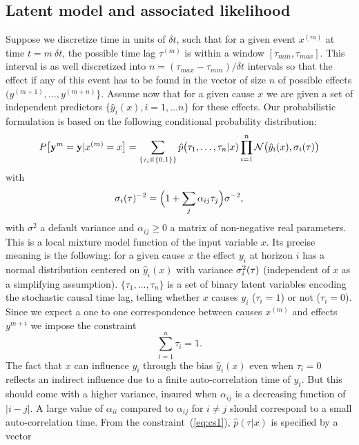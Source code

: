 \documentclass[envcountsect,runningheads]{llncs}
\theoremstyle{etoile}
\begin{document}
\subsection{Latent model and associated likelihood}\label{sec:latent}

Suppose we discretize time in units of $\delta t$, such that for a given event $x^{(m)}$ at time  
$t = m\ \delta t$, the possible time lag $\tau^{(m)}$ is within a window $[\tau_{min},\tau_{max}]$. 
This interval is as well discretized into $n = (\tau_{max}-\tau_{min})/\delta t $ intervals so that 
the effect if any of this event has to be found in the vector of size $n$ of possible effects $(y^{(m+1)},\ldots,y^{(m+n)}\}$.
Assume now that for a given cause $x$ we are given a set of independent predictors $\{\hat y_i(x),i=1,\ldots n\}$ for these effects.
Our probabilistic formulation is based on the following conditional probability distribution:
\begin{equation}\label{eq:py}
  P\bigl[{\bf y}^{m} = {\bf y}\vert x^{(m)}=x\bigr] = \sum_{\{\tau_i\in\{0,1\}\}}  \hat p\bigl(\tau_1,\ldots,\tau_n\vert x)
\prod_{i=1}^n {\cal N}\bigl(\hat y_i(x),\sigma_i(\tau)\bigr)
\end{equation}
with 
\[
\sigma_i({\bf \tau})^{-2} = \Bigl(1+\sum_j\alpha_{ij} \tau_j\Bigr)\sigma^{-2},
\]
with $\sigma^2$ a default variance and $\alpha_{ij}\ge 0$ a matrix of non-negative real parameters. 
This is a local mixture model function of the input variable $x$. Its precise meaning is the following: for a given cause $x$ the effect
$y_i$ at horizon $i$ has a normal distribution centered on $\hat y_i(x)$ with  variance $\sigma_i^2({\bf \tau})$ (independent of $x$ as a simplifying assumption). $\{\tau_1,\ldots,\tau_n\}$ is a set of binary
latent variables encoding the stochastic causal time lag, telling whether $x$ causes $y_i$ ($\tau_i=1$) or not ($\tau_i=0$). Since we expect a one to one correspondence between causes
$x^{(m)}$ and effects $y^{m+i}$ we impose the constraint
\begin{equation}\label{eq:cs1}
\sum_{i=1}^n \tau_i = 1.
\end{equation}
The fact that $x$ can influence $y_i$ through the bias $\hat y_i(x)$ even when $\tau_i=0$ reflects an indirect
influence due to a finite auto-correlation time of $y_t$. But this should come with a higher variance, insured when $\alpha_{ij}$ is a decreasing function of $\vert i-j\vert$.
A large value of $\alpha_{ii}$ compared to $\alpha_{ij}$ for  $i\ne j$ 
should correspond to a small auto-correlation time. From the constraint~(\ref{eq:cs1}), $\hat p(\tau\vert x)$ is specified by  a vector
\end{document}
